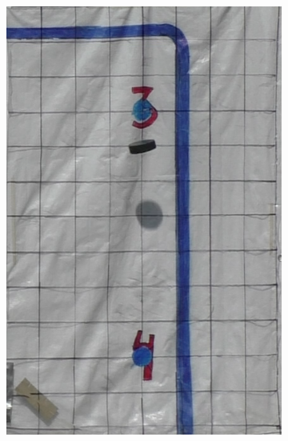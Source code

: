 \documentclass[a4paper,12pt]{article}
\begin{document}
\begin{figure}[ht]
\begin{subfigure}[t]{0.24\textwidth}
    \includegraphics[width=\linewidth]{photos/skott3.png}
  \end{subfigure}%
  \hspace*{\fill}
  \begin{subfigure}[t]{0.24\textwidth}
    \centering

\end{subfigure}
\end{figure}
\end{document}
